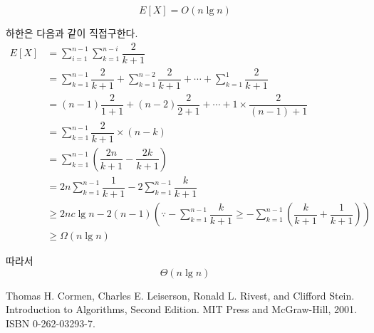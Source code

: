 \documentclass{oblivoir}
\begin{document}
$$E[X]= O(n \lg n)$$

하한은 다음과 같이 직접구한다.
\begin{align*}    
E[X] &= \sum_{i=1}^{n-1}\sum_{k = 1}^{n-i} \dfrac{2}{k+1} \\
& = \sum_{k = 1}^{n-1} \dfrac{2}{k+1} + \sum_{k = 1}^{n-2} \dfrac{2}{k+1} + \cdots + \sum_{k = 1}^{1} \dfrac{2}{k+1}\\
& = (n-1)\dfrac{2}{1+1} + (n-2)\dfrac{2}{2+1} + \cdots +1 \times \dfrac{2}{(n-1)+1}\\
& = \sum_{k=1}^{n-1} \dfrac{2}{k+1} \times (n-k)\\
& = \sum_{k=1}^{n-1} \left( \dfrac{2n}{k+1} -\dfrac{2k}{k+1}\right)\\
& = 2n \sum_{k=1}^{n-1} \dfrac{1}{k+1} - 2\sum_{k=1}^{n-1} \dfrac{k}{k+1}\\
& \ge 2nc\lg n - 2(n-1) \left(\because -\sum_{k=1}^{n-1} \dfrac{k}{k+1} \ge -\sum_{k=1}^{n-1}\left( \dfrac{k}{k+1}+\dfrac{1}{k+1}  \right)\right)\\
& \ge \Omega(n\lg n) 
\end{align*}

따라서 $$\Theta(n\lg n)$$






\begin{thebibliography}{}
    Thomas H. Cormen, Charles E. Leiserson, Ronald L. Rivest, and Clifford Stein. Introduction to Algorithms, Second Edition. MIT Press and McGraw-Hill, 2001. ISBN 0-262-03293-7.
\end{thebibliography}
    
\end{document}
